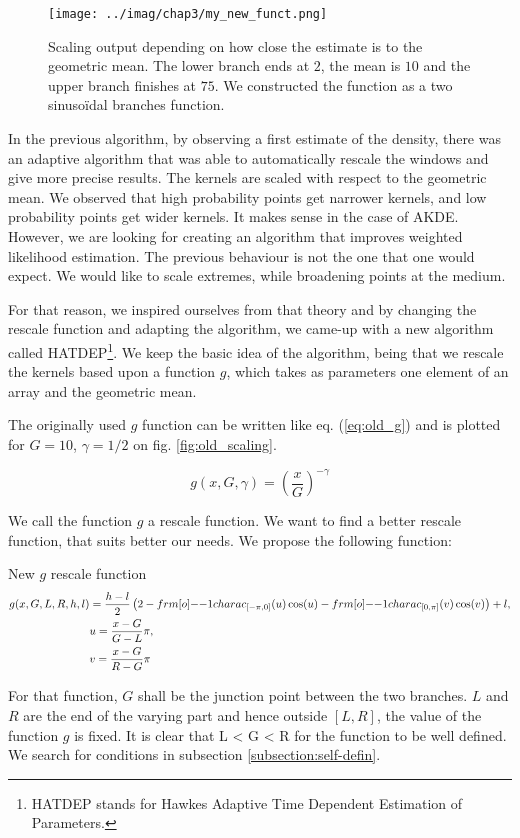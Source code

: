 \documentclass[11pt]{book}
\begin{document}
\begin{figure}
\centering
\texttt{[image: ../imag/chap3/my\_new\_funct.png]}
\caption{Scaling output depending on how close the estimate is to the geometric mean. The lower branch ends at $2$, the mean is $10$ and the upper branch finishes at $75$. We constructed the function as a two sinusoïdal branches function.}
\label{fig:new_scaling}
\end{figure}

In the previous algorithm, by observing a first estimate of the density, there was an adaptive algorithm that was able to automatically rescale the windows and give more precise results. The kernels are scaled with respect to the geometric mean. We observed that high probability points get narrower kernels, and low probability points get wider kernels. It makes sense in the case of AKDE. However, we are looking for creating an algorithm that improves weighted likelihood estimation. The previous behaviour is not the one that one would expect. We would like to scale extremes, while broadening points at the medium.


For that reason, we inspired ourselves from that theory and by changing the rescale function and adapting the algorithm, we came-up with a new algorithm called HATDEP\footnote{HATDEP stands for Hawkes Adaptive Time Dependent Estimation of Parameters.}. We keep the basic idea of the algorithm, being that we rescale the kernels based upon a function $g$, which takes as parameters one element of an array and the geometric mean. 

The originally used $g$ function can be written like eq. (\ref{eq:old_g}) and is plotted for $G = 10$, $\gamma = 1/2$ on fig. \ref{fig:old_scaling}. 

\begin{equation}
\label{eq:old_g}
g(x,G, \gamma) =  \left ( \frac x G \right ) ^{-\gamma}
\end{equation}

We call the function $g$ a rescale function. We want to find a better rescale function, that suits better our needs. We propose the following function:


\begin{theoreme}[label = thrm:new_g]{New $g$ rescale function}
\begin{align}
\label{eq:new_g}
g(x, G, L,R,h,l) &=   \frac {h-l} 2 \left (2 
-  \11charac_{ [- \pi, 0]} (u)  \cos(u)
-  \11charac_{ [0, \pi]} (v)  \cos(v) \right ) + l,  \\
\quad & u = \frac{x - G}{G- L} \pi, \notag  \\
\quad & v = \frac{x - G}{R- G} \pi \notag
\end{align}

For that function, $G$ shall be the junction point between the two branches. $L$ and $R$ are the end of the varying part and hence outside $[L,R]$, the value of the function $g$ is fixed. It is clear that L < G < R for the function to be well defined. We search for conditions in subsection \ref{subsection:self-defin}.
\end{theoreme}
\end{document}
